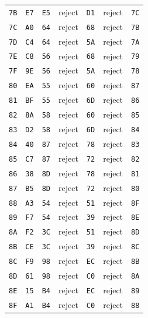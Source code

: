 \begin{longtable}{lllllll}
\texttt{7B} & \texttt{E7} & \texttt{E5} & reject & \texttt{D1} & reject & \texttt{7C}\\
\texttt{7C} & \texttt{A0} & \texttt{64} & reject & \texttt{68} & reject & \texttt{7B}\\
\texttt{7D} & \texttt{C4} & \texttt{64} & reject & \texttt{5A} & reject & \texttt{7A}\\
\texttt{7E} & \texttt{C8} & \texttt{56} & reject & \texttt{68} & reject & \texttt{79}\\
\texttt{7F} & \texttt{9E} & \texttt{56} & reject & \texttt{5A} & reject & \texttt{78}\\
\texttt{80} & \texttt{EA} & \texttt{55} & reject & \texttt{60} & reject & \texttt{87}\\
\texttt{81} & \texttt{BF} & \texttt{55} & reject & \texttt{6D} & reject & \texttt{86}\\
\texttt{82} & \texttt{8A} & \texttt{58} & reject & \texttt{60} & reject & \texttt{85}\\
\texttt{83} & \texttt{D2} & \texttt{58} & reject & \texttt{6D} & reject & \texttt{84}\\
\texttt{84} & \texttt{40} & \texttt{87} & reject & \texttt{78} & reject & \texttt{83}\\
\texttt{85} & \texttt{C7} & \texttt{87} & reject & \texttt{72} & reject & \texttt{82}\\
\texttt{86} & \texttt{38} & \texttt{8D} & reject & \texttt{78} & reject & \texttt{81}\\
\texttt{87} & \texttt{B5} & \texttt{8D} & reject & \texttt{72} & reject & \texttt{80}\\
\texttt{88} & \texttt{A3} & \texttt{54} & reject & \texttt{51} & reject & \texttt{8F}\\
\texttt{89} & \texttt{F7} & \texttt{54} & reject & \texttt{39} & reject & \texttt{8E}\\
\texttt{8A} & \texttt{F2} & \texttt{3C} & reject & \texttt{51} & reject & \texttt{8D}\\
\texttt{8B} & \texttt{CE} & \texttt{3C} & reject & \texttt{39} & reject & \texttt{8C}\\
\texttt{8C} & \texttt{F9} & \texttt{98} & reject & \texttt{EC} & reject & \texttt{8B}\\
\texttt{8D} & \texttt{61} & \texttt{98} & reject & \texttt{C0} & reject & \texttt{8A}\\
\texttt{8E} & \texttt{15} & \texttt{B4} & reject & \texttt{EC} & reject & \texttt{89}\\
\texttt{8F} & \texttt{A1} & \texttt{B4} & reject & \texttt{C0} & reject & \texttt{88}\\

\end{longtable}
